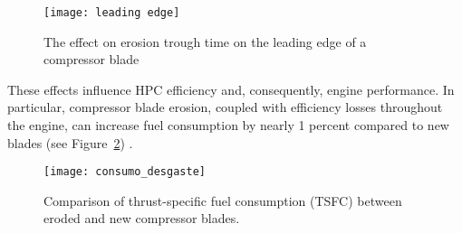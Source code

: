 \begin{figure}[H]
    \centering
    \texttt{[image: leading edge]}
    \caption{The effect on erosion trough time on the leading edge of a compressor blade \cite{Shi2023}}
    \label{fig:leadedge}
\end{figure}


These effects influence \gls{HPC} efficiency and, consequently, engine performance. In particular, compressor blade erosion, coupled with efficiency losses throughout the engine, can increase fuel consumption by nearly 1 percent compared to new blades (see Figure~\ref{fig:consumo_desgaste}) \cite{Shi2023}.

\begin{figure}[H]
    \centering
    \texttt{[image: consumo\_desgaste]}
    \caption{Comparison of thrust-specific fuel consumption (TSFC) between eroded and new compressor blades.\cite{Shi2023}}
    \label{fig:consumo_desgaste}
\end{figure}




